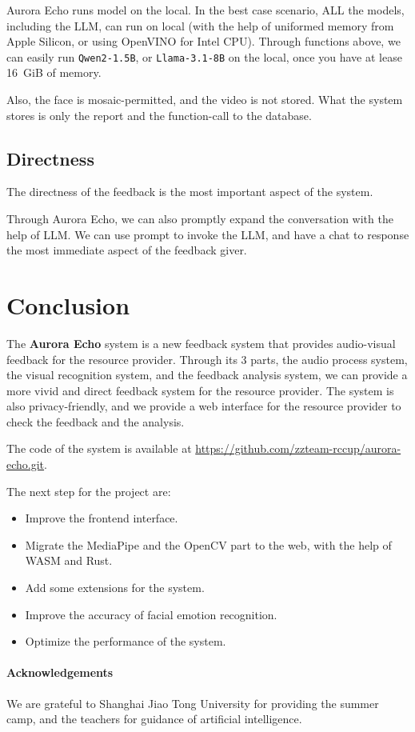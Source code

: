 \documentclass{article}
\begin{document}
    Aurora Echo runs model on the local.
    In the best case scenario, ALL the models, including the LLM, can run on local (with the help of uniformed memory from Apple Silicon, or using OpenVINO for Intel CPU).
    Through functions above, we can easily run \texttt{Qwen2-1.5B}, or \texttt{Llama-3.1-8B} on the local, once you have at lease \qty{16}{GiB} of memory.

    Also, the face is mosaic-permitted, and the video is not stored.
    What the system stores is only the report and the function-call to the database.

    \subsection{Directness}\label{subsec:directness}

    The directness of the feedback is the most important aspect of the system.

    Through Aurora Echo, we can also promptly expand the conversation with the help of LLM\@.
    We can use prompt to invoke the LLM, and have a chat to response the most immediate aspect of the feedback giver.

    \section{Conclusion}\label{sec:conclusion}

    The \textbf{Aurora Echo} system is a new feedback system that provides audio-visual feedback for the resource provider.
    Through its 3 parts, the audio process system, the visual recognition system, and the feedback analysis system, we can provide a more vivid and direct feedback system for the resource provider.
    The system is also privacy-friendly, and we provide a web interface for the resource provider to check the feedback and the analysis.

    The code of the system is available at \url{https://github.com/zzteam-rccup/aurora-echo.git}.

    The next step for the project are:

    \begin{itemize}
        \item Improve the frontend interface.
        \item Migrate the MediaPipe and the OpenCV part to the web, with the help of WASM and Rust.
        \item Add some extensions for the system.
        \item Improve the accuracy of facial emotion recognition.
        \item Optimize the performance of the system.
    \end{itemize}

    \paragraph{Acknowledgements}

    We are grateful to Shanghai Jiao Tong University for providing the summer camp, and the teachers for guidance of artificial intelligence.

    \nocite{*}
    
    
\end{document}

